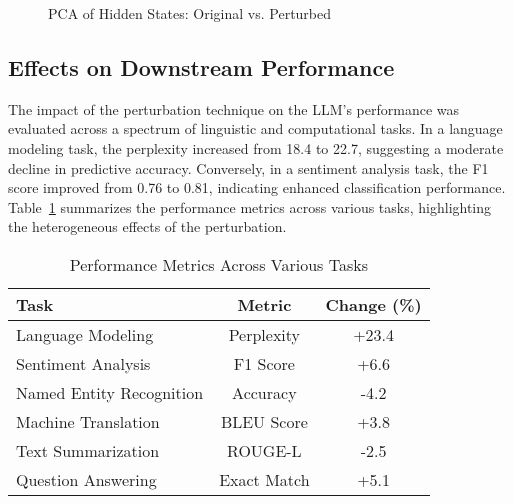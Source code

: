 \documentclass[5p,times]{elsarticle}
\begin{document}
\begin{figure}[ht]
	\centering
	\caption{PCA of Hidden States: Original vs. Perturbed}
	\label{fig:pca}
\end{figure}

\subsection{Effects on Downstream Performance}

The impact of the perturbation technique on the LLM's performance was evaluated across a spectrum of linguistic and computational tasks. In a language modeling task, the perplexity increased from 18.4 to 22.7, suggesting a moderate decline in predictive accuracy. Conversely, in a sentiment analysis task, the F1 score improved from 0.76 to 0.81, indicating enhanced classification performance. Table~\ref{tab:performance} summarizes the performance metrics across various tasks, highlighting the heterogeneous effects of the perturbation.

\begin{table}[ht]
	\centering
	\begin{tabular}{lcc}
		\hline
		\textbf{Task} & \textbf{Metric} & \textbf{Change (\%)} \\
		\hline
		Language Modeling & Perplexity & +23.4 \\
		Sentiment Analysis & F1 Score & +6.6 \\
		Named Entity Recognition & Accuracy & -4.2 \\
		Machine Translation & BLEU Score & +3.8 \\
		Text Summarization & ROUGE-L & -2.5 \\
		Question Answering & Exact Match & +5.1 \\
		\hline
	\end{tabular}
	\caption{Performance Metrics Across Various Tasks}
	\label{tab:performance}
\end{table}
\end{document}
